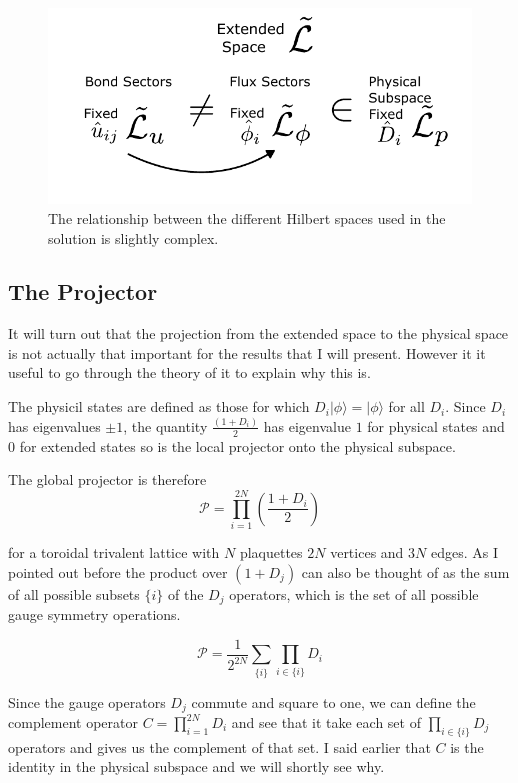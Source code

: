 \begin{figure}
\hypertarget{fig:hilbert_spaces}{%
\centering
\includegraphics[width=1\textwidth,height=\textheight]{figure_code/amk_chapter/hilbert_spaces.pdf}
\caption{The relationship between the different Hilbert spaces used in
the solution is slightly complex.}\label{fig:hilbert_spaces}
}
\end{figure}

\hypertarget{the-projector}{%
\subsection{The Projector}\label{the-projector}}

It will turn out that the projection from the extended space to the
physical space is not actually that important for the results that I
will present. However it it useful to go through the theory of it to
explain why this is.

The physicil states are defined as those for which
\(D_i |\phi\rangle = |\phi\rangle\) for all \(D_i\). Since \(D_i\) has
eigenvalues \(\pm1\), the quantity \(\tfrac{(1+D_i)}{2}\) has eigenvalue
\(1\) for physical states and \(0\) for extended states so is the local
projector onto the physical subspace.

The global projector is therefore
\[ \mathcal{P} = \prod_{i=1}^{2N} \left( \frac{1 + D_i}{2}\right)\]

for a toroidal trivalent lattice with \(N\) plaquettes \(2N\) vertices
and \(3N\) edges. As I pointed out before the product over \((1 + D_j)\)
can also be thought of as the sum of all possible subsets \(\{i\}\) of
the \(D_j\) operators, which is the set of all possible gauge symmetry
operations.

\[ \mathcal{P} = \frac{1}{2^{2N}} \sum_{\{i\}} \prod_{i\in\{i\}} D_i\]

Since the gauge operators \(D_j\) commute and square to one, we can
define the complement operator \(C = \prod_{i=1}^{2N} D_i\) and see that
it take each set of \(\prod_{i \in \{i\}} D_j\) operators and gives us
the complement of that set. I said earlier that \(C\) is the identity in
the physical subspace and we will shortly see why.

